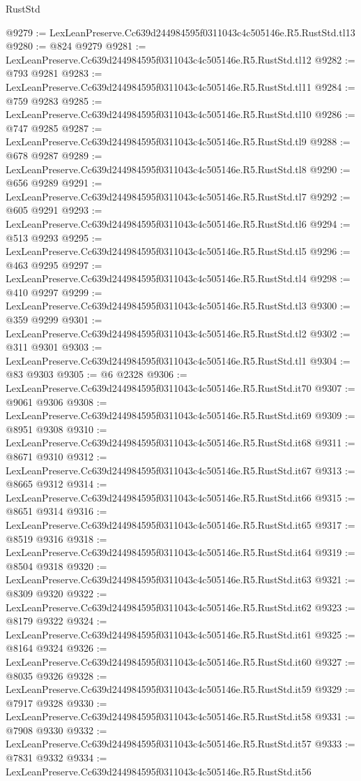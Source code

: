 \begin{lexlean}{RustStd}
\begin{coremodule}
@9279 := LexLeanPreserve.Cc639d244984595f0311043c4c505146e.R5.RustStd.tl13
@9280 := @824 @9279
@9281 := LexLeanPreserve.Cc639d244984595f0311043c4c505146e.R5.RustStd.tl12
@9282 := @793 @9281
@9283 := LexLeanPreserve.Cc639d244984595f0311043c4c505146e.R5.RustStd.tl11
@9284 := @759 @9283
@9285 := LexLeanPreserve.Cc639d244984595f0311043c4c505146e.R5.RustStd.tl10
@9286 := @747 @9285
@9287 := LexLeanPreserve.Cc639d244984595f0311043c4c505146e.R5.RustStd.tl9
@9288 := @678 @9287
@9289 := LexLeanPreserve.Cc639d244984595f0311043c4c505146e.R5.RustStd.tl8
@9290 := @656 @9289
@9291 := LexLeanPreserve.Cc639d244984595f0311043c4c505146e.R5.RustStd.tl7
@9292 := @605 @9291
@9293 := LexLeanPreserve.Cc639d244984595f0311043c4c505146e.R5.RustStd.tl6
@9294 := @513 @9293
@9295 := LexLeanPreserve.Cc639d244984595f0311043c4c505146e.R5.RustStd.tl5
@9296 := @463 @9295
@9297 := LexLeanPreserve.Cc639d244984595f0311043c4c505146e.R5.RustStd.tl4
@9298 := @410 @9297
@9299 := LexLeanPreserve.Cc639d244984595f0311043c4c505146e.R5.RustStd.tl3
@9300 := @359 @9299
@9301 := LexLeanPreserve.Cc639d244984595f0311043c4c505146e.R5.RustStd.tl2
@9302 := @311 @9301
@9303 := LexLeanPreserve.Cc639d244984595f0311043c4c505146e.R5.RustStd.tl1
@9304 := @83 @9303
@9305 := @6 @2328
@9306 := LexLeanPreserve.Cc639d244984595f0311043c4c505146e.R5.RustStd.it70
@9307 := @9061 @9306
@9308 := LexLeanPreserve.Cc639d244984595f0311043c4c505146e.R5.RustStd.it69
@9309 := @8951 @9308
@9310 := LexLeanPreserve.Cc639d244984595f0311043c4c505146e.R5.RustStd.it68
@9311 := @8671 @9310
@9312 := LexLeanPreserve.Cc639d244984595f0311043c4c505146e.R5.RustStd.it67
@9313 := @8665 @9312
@9314 := LexLeanPreserve.Cc639d244984595f0311043c4c505146e.R5.RustStd.it66
@9315 := @8651 @9314
@9316 := LexLeanPreserve.Cc639d244984595f0311043c4c505146e.R5.RustStd.it65
@9317 := @8519 @9316
@9318 := LexLeanPreserve.Cc639d244984595f0311043c4c505146e.R5.RustStd.it64
@9319 := @8504 @9318
@9320 := LexLeanPreserve.Cc639d244984595f0311043c4c505146e.R5.RustStd.it63
@9321 := @8309 @9320
@9322 := LexLeanPreserve.Cc639d244984595f0311043c4c505146e.R5.RustStd.it62
@9323 := @8179 @9322
@9324 := LexLeanPreserve.Cc639d244984595f0311043c4c505146e.R5.RustStd.it61
@9325 := @8164 @9324
@9326 := LexLeanPreserve.Cc639d244984595f0311043c4c505146e.R5.RustStd.it60
@9327 := @8035 @9326
@9328 := LexLeanPreserve.Cc639d244984595f0311043c4c505146e.R5.RustStd.it59
@9329 := @7917 @9328
@9330 := LexLeanPreserve.Cc639d244984595f0311043c4c505146e.R5.RustStd.it58
@9331 := @7908 @9330
@9332 := LexLeanPreserve.Cc639d244984595f0311043c4c505146e.R5.RustStd.it57
@9333 := @7831 @9332
@9334 := LexLeanPreserve.Cc639d244984595f0311043c4c505146e.R5.RustStd.it56

\end{coremodule}
\end{lexlean}
